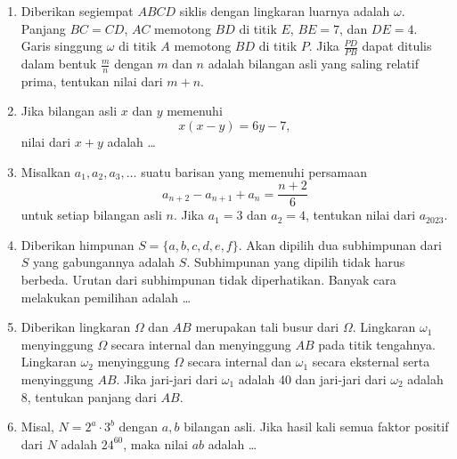 \documentclass[12pt]{scrartcl}
\begin{document}
\begin{enumerate}[resume]
\item Diberikan segiempat $ABCD$ siklis dengan lingkaran luarnya adalah $\omega$. Panjang $BC=CD$, $AC$ memotong $BD$ di titik $E$, $BE=7$, dan $DE=4$. Garis singgung $\omega$ di titik $A$ memotong $BD$ di titik $P$. Jika $\frac{PD}{PB}$ dapat ditulis dalam bentuk $\frac{m}{n}$ dengan $m$ dan $n$ adalah bilangan asli yang saling relatif prima, tentukan nilai dari $m+n$.

\item Jika bilangan asli $x$ dan $y$ memenuhi
$$x(x-y)=6y-7,$$
nilai dari $x+y$ adalah \dots

\item Misalkan $a_1,a_2,a_3,\dots$ suatu barisan yang memenuhi persamaan
$$a_{n+2}-a_{n+1}+a_{n}=\dfrac{n+2}{6}$$
untuk setiap bilangan asli $n$. Jika $a_1=3$ dan $a_2=4$, tentukan nilai dari $a_{2023}$.

\item Diberikan himpunan $S = \{a,b,c,d,e,f\}$. Akan dipilih dua subhimpunan dari $S$ yang gabungannya adalah $S$. Subhimpunan yang dipilih tidak harus berbeda. Urutan dari subhimpunan tidak diperhatikan. Banyak cara melakukan pemilihan adalah \dots

\item Diberikan lingkaran $\Omega$ dan $AB$ merupakan tali busur dari $\Omega$. Lingkaran $\omega_1$ menyinggung $\Omega$ secara internal dan menyinggung $AB$ pada titik tengahnya. Lingkaran $\omega_2$ menyinggung $\Omega$ secara internal dan $\omega_1$ secara eksternal serta menyinggung $AB$. Jika jari-jari dari $\omega_1$ adalah 40 dan jari-jari dari $\omega_2$ adalah 8, tentukan panjang dari $AB$.
\begin{center}
\end{center}

\item Misal, $N = 2^a \cdot 3^b$ dengan $a, b$ bilangan asli. Jika hasil kali semua faktor positif dari $N$ adalah $24^{60}$, maka nilai $ab$ adalah \dots


\end{enumerate}
\end{document}
